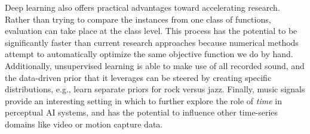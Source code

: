 Deep learning also offers practical advantages toward accelerating research.
Rather than trying to compare the instances from one class of functions, evaluation can take place at the class level.
This process has the potential to be significantly faster than current research approaches because numerical methods attempt to automatically optimize the same objective function we do by hand.
Additionally, unsupervised learning is able to make use of all recorded sound, and the data-driven prior that it leverages can be steered by creating specific distributions, e.g., learn separate priors for rock versus jazz.
Finally, music signals provide an interesting setting in which to further explore the role of \emph{time} in perceptual AI systems, and has the potential to influence other time-series domains like video or motion capture data.
